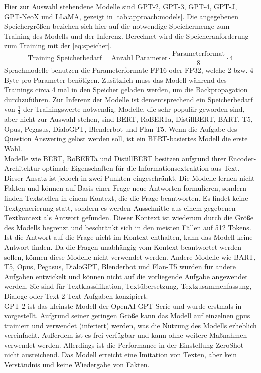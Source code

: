 Hier zur Auswahl stehendene Modelle sind GPT-2, GPT-3, GPT-4, GPT-J, GPT-NeoX und LLaMA, gezeigt in \cref{tab:approach:models}.
Die angegebenen Speichergrößen beziehen sich hier auf die notwendige Speichermenge zum Training des Modells und der Inferenz.
Berechnet wird die Speicheranforderung zum Training mit der \cref{eq:speicher}.
\begin{equation}\label{eq:speicher}
    \text{Training Speicherbedarf}=\text{Anzahl Parameter} \cdot \frac{\text{Parameterformat}}{8} \cdot 4
\end{equation}
Sprachmodelle benutzen die Parameterformate FP16 oder FP32, welche 2 bzw. 4 Byte pro Parameter benötigen. Zusätzlich muss das Modell während des Trainings circa 4 mal in den Speicher geladen werden, um die Backpropagation durchzuführen. 
Zur Inferenz der Modelle ist dementsprechend ein Speicherbedarf von $\frac{1}{4}$ der Trainingswerte notwendig.
Modelle, die sehr populär geworden sind, aber nicht zur Auswahl stehen, sind BERT, RoBERTa, DistillBERT, BART, T5, Opus, Pegasus, DialoGPT, Blenderbot und Flan-T5.
Wenn die Aufgabe des Question Answering gelöst werden soll, ist ein BERT-basiertes Modell die erste Wahl.\\

Modelle wie BERT, RoBERTa und DistillBERT besitzen aufgrund ihrer Encoder-Architektur optimale Eigenschaften für die Informationsextraktion aus Text.
Dieser Ansatz ist jedoch in zwei Punkten eingeschränkt.
Die Modelle lernen nicht Fakten und können auf Basis einer Frage neue Antworten formulieren, sondern finden Textstellen in einem Kontext, die die Frage beantworten.
Es findet keine Textgenerierung statt, sondern es werden Ausschnitte aus einem gegebenen Textkontext als Antwort gefunden.
Dieser Kontext ist wiederum durch die Größe des Modells begrenzt und beschränkt sich in den meisten Fällen auf 512 Tokens.
Ist die Antwort auf die Frage nicht im Kontext enthalten, kann das Modell keine Antwort finden.
Da die Fragen unabhängig vom Kontext beantwortet werden sollen, können diese Modelle nicht verwendet werden.
Andere Modelle wie BART, T5, Opus, Pegasus, DialoGPT, Blenderbot und Flan-T5 wurden für andere Aufgaben entwickelt und können nicht auf die vorliegende Aufgabe angewendet werden.
Sie sind für Textklassifikation, Textübersetzung, Textzusammenfassung, Dialoge oder Text-2-Text-Aufgaben konzipiert.\\

GPT-2 ist das kleinste Modell der OpenAI GPT-Serie und wurde erstmals in \citet{gpt2} vorgestellt.
Aufgrund seiner geringen Größe kann das Modell auf einzelnen \ac{gpu}s trainiert und verwendet (inferiert) werden, was die Nutzung des Modells erheblich vereinfacht.
Außerdem ist es frei verfügbar und kann ohne weitere Maßnahmen verwendet werden.
Allerdings ist die Performance in der Einstellung ZeroShot nicht ausreichend.
Das Modell erreicht eine Imitation von Texten, aber kein Verständnis und keine Wiedergabe von Fakten.\\

